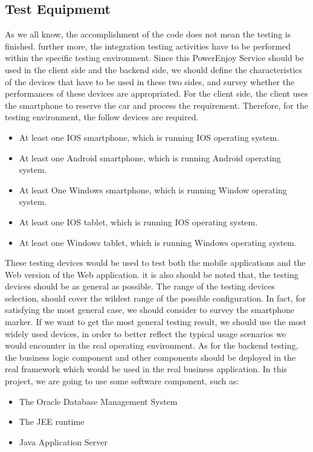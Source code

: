 \documentclass{article}
\begin{document}
	\subsection{Test Equipmemt}
	As we all know, the accomplishment of the code does not mean the testing is finished. further more, the integration testing activities have to be performed within the specific testing environment.
	\newline
	Since this PowerEnjoy Service should be used in the client side and the backend side, we should define the characteristics of the devices that have to be used in these two sides, and survey whether the performances of these devices are appropriated.
	\newline
	For the client side, the client uses the smartphone to reserve the car and process the requirement. Therefore, for the testing environment, the follow devices are required.
		\begin{itemize}
			\item At least one IOS smartphone, which is running IOS operating system.
			\item At least one Android smartphone, which is running Android operating system.
			\item At least One Windows smartphone, which is running Window operating system.
			\item At least one IOS tablet, which is running IOS operating system.
			\item At least one Windows tablet, which is running Windows operating system.
		\end{itemize}
	These testing devices would be used to test both the mobile applications and the Web version of the Web application. it is also should be noted that, the testing devices should be as general as possible. The range of the testing devices selection, should cover the wildest range of the possible configuration.
	\newline
	In fact, for satisfying the most general case, we should consider to survey the smartphone marker. If we want to get the most general testing result, we should use the most widely used devices, in order to better reflect the typical usage scenarios we would encounter in the real operating environment.
	\newline
	As for the backend testing, the business logic component and other components should be deployed in the real framework which would be used in the real business application. In this project, we are going to use some software component, such as:
		\begin{itemize}
			\item The Oracle Database Management System
			\item The JEE runtime
			\item Java Application Server
		\end{itemize}
	
\end{document}
